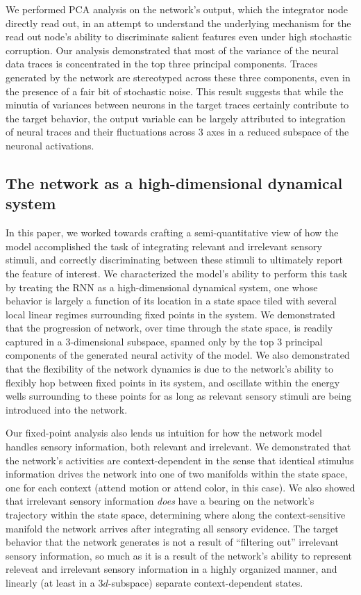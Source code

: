 \documentclass[12pt,a4paper,final]{iopart}
\begin{document}
We performed PCA analysis on the network's output, which the integrator node directly read out, in an attempt to understand the underlying mechanism for the read out node's ability to discriminate salient features even under high stochastic corruption. Our analysis demonstrated that most of the variance of the neural data traces is concentrated in the top three principal components. Traces generated by the network are stereotyped across these three components, even in the presence of a fair bit of stochastic noise. This result suggests that while the minutia of variances between neurons in the target traces certainly contribute to the target behavior, the output variable can be largely attributed to integration of neural traces and their fluctuations across $3$ axes in a reduced subspace of the neuronal activations.

\subsection{The network as a high-dimensional dynamical system}
In this paper, we worked towards crafting a semi-quantitative view of how the model accomplished the task of integrating relevant and irrelevant sensory stimuli, and correctly discriminating between these stimuli to ultimately report the feature of interest. We characterized the model's ability to perform this task by treating the RNN as a high-dimensional dynamical system, one whose behavior is largely a function of its location in a state space tiled with several local linear regimes surrounding fixed points in the system. We demonstrated that the progression of network, over time through the state space, is readily captured in a $3$-dimensional subspace, spanned only by the top $3$ principal components of the generated neural activity of the model. We also demonstrated that the flexibility of the network dynamics is due to the network's ability to flexibly hop between fixed points in its system, and oscillate within the energy wells surrounding to these points for as long as relevant sensory stimuli are being introduced into the network.

Our fixed-point analysis also lends us intuition for how the network model handles sensory information, both relevant and irrelevant. We demonstrated that the network's activities are context-dependent in the sense that identical stimulus information drives the network into one of two manifolds within the state space, one for each context (attend motion or attend color, in this case). We also showed that irrelevant sensory information \emph{does} have a bearing on the network's trajectory within the state space, determining where along the context-sensitive manifold the network arrives after integrating all sensory evidence. The target behavior that the network generates is not a result of ``filtering out'' irrelevant sensory information, so much as it is a result of the network's ability to represent releveat and irrelevant sensory information in a highly organized manner, and linearly (at least in a $3d$-subspace) separate context-dependent states.
\end{document}
